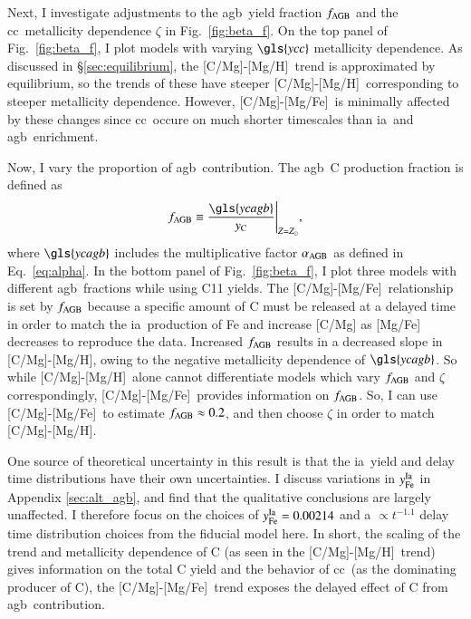 \documentclass[12pt,oneside,letterpaper]{report}
\newcommand{\cc}{\gls{cc}}
\newcommand{\agb}{\gls{agb}}
\newcommand{\ia}{\gls{ia}}
\newcommand{\Ycc}{\gls{ycc}}
\newcommand{\Ycagb}{\gls{ycagb}}
\newcommand{\Yct}{\ensuremath{y_{\rm C}}}
\newcommand{\caah}{[C/Mg]-[Mg/H]}
\newcommand{\caafe}{[C/Mg]-[Mg/Fe]}
\begin{document}
Next, I investigate adjustments to the \agb\ yield fraction $f_{\rm AGB}$ and the \cc\ metallicity dependence $\zeta$ in Fig.~\ref{fig:beta_f}. On the top panel of Fig.~\ref{fig:beta_f}, I plot models with varying $\Ycc$ metallicity dependence. As discussed in \S\ref{sec:equilibrium}, the \caah~trend is approximated by equilibrium, so the trends of these have steeper \caah~corresponding to steeper metallicity dependence. However, \caafe~is minimally affected by these changes since \cc\ occure on much shorter timescales than \ia\ and \agb\ enrichment.

Now, I vary the proportion of \agb\ contribution.  The \agb\ C production fraction is defined as
\begin{equation}
    f_{\rm AGB} \equiv \frac{\Ycagb}{\Yct}\Bigg\vert_{Z=Z_\odot},
\end{equation}
where  $\Ycagb$ includes the multiplicative factor $\alpha_{\rm AGB}$ as defined in Eq.~\ref{eq:alpha}.
In the bottom panel of Fig.~\ref{fig:beta_f}, I plot three models with different \agb\ fractions while using C11 yields.  The \caafe~relationship is set by $f_{\rm AGB}$ because a specific amount of C must be released at a delayed time in order to match the \ia\ production of Fe and increase [C/Mg] as [Mg/Fe] decreases to reproduce the data.
Increased $f_{\rm AGB}$ results in a decreased slope in \caah, owing to the negative metallicity dependence of $\Ycagb$. So while \caah~alone cannot differentiate models which vary $f_{\rm AGB}$ and $\zeta$ correspondingly, \caafe~provides information on $f_{\rm AGB}$. So, I can use \caafe~to estimate $f_{\rm AGB}\approx 0.2$, and then choose $\zeta$ in order to match \caah.

One source of theoretical uncertainty in this result is that the \ia\ yield and delay time distributions have their own uncertainties. I discuss variations in $y_{\rm Fe}^{\rm Ia}$ in Appendix \ref{sec:alt_agb}, and find that the qualitative conclusions are largely unaffected. I therefore focus on the choices of $y_{\rm Fe}^{\rm Ia} = 0.00214$ and a $\propto t^{-1.1}$ delay time distribution choices from the fiducial model here.
In short, the scaling of the trend and metallicity dependence of C (as seen in
the \caah\ trend) gives information on the total C yield and the behavior of \cc\ (as the dominating producer of C), the \caafe\ trend exposes the delayed effect of C from \agb\ contribution.
\end{document}
